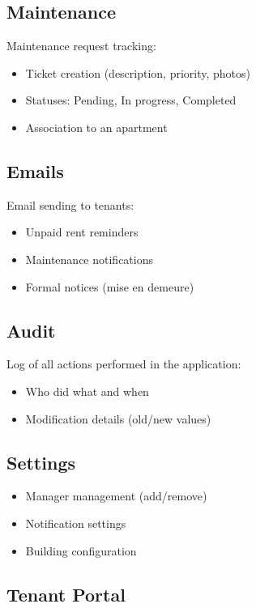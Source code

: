\documentclass[a4paper,11pt]{article}
\begin{document}
\subsection{Maintenance}

Maintenance request tracking:
\begin{itemize}
  \item Ticket creation (description, priority, photos)
  \item Statuses: Pending, In progress, Completed
  \item Association to an apartment
\end{itemize}

\subsection{Emails}

Email sending to tenants:
\begin{itemize}
  \item Unpaid rent reminders
  \item Maintenance notifications
  \item Formal notices (mise en demeure)
\end{itemize}

\subsection{Audit}

Log of all actions performed in the application:
\begin{itemize}
  \item Who did what and when
  \item Modification details (old/new values)
\end{itemize}

\subsection{Settings}

\begin{itemize}
  \item Manager management (add/remove)
  \item Notification settings
  \item Building configuration
\end{itemize}

\subsection{Tenant Portal}
\end{document}

